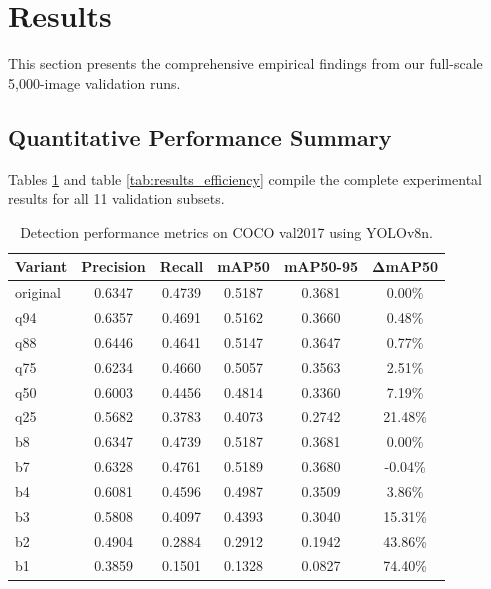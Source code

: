 \documentclass[12pt, a4paper]{article}
\begin{document}
\section{Results}
This section presents the comprehensive empirical findings from our full-scale 5,000-image validation runs.

\subsection{Quantitative Performance Summary}
Tables \ref{tab:results_perf} and table \ref{tab:results_efficiency} compile the complete experimental results for all 11 validation subsets. 

\begin{table}[t]
\centering
\caption{Detection performance metrics on COCO val2017 using YOLOv8n.}
\label{tab:results_perf}

\begin{tabular}{|l|c|c|c|c|c|}
\hline
\textbf{Variant} & \textbf{Precision} & \textbf{Recall} & \textbf{mAP50} & \textbf{mAP50-95} & $\boldsymbol{\Delta}$\textbf{mAP50} \\ \hline

original & 0.6347 & 0.4739 & 0.5187 & 0.3681 & 0.00\% \\ \hline
q94 & 0.6357 & 0.4691 & 0.5162 & 0.3660 & 0.48\% \\ \hline
q88 & 0.6446 & 0.4641 & 0.5147 & 0.3647 & 0.77\% \\ \hline
q75 & 0.6234 & 0.4660 & 0.5057 & 0.3563 & 2.51\% \\ \hline
q50 & 0.6003 & 0.4456 & 0.4814 & 0.3360 & 7.19\% \\ \hline
q25 & 0.5682 & 0.3783 & 0.4073 & 0.2742 & 21.48\% \\ \hline
b8 & 0.6347 & 0.4739 & 0.5187 & 0.3681 & 0.00\% \\ \hline
b7 & 0.6328 & 0.4761 & 0.5189 & 0.3680 & -0.04\% \\ \hline
b4 & 0.6081 & 0.4596 & 0.4987 & 0.3509 & 3.86\% \\ \hline
b3 & 0.5808 & 0.4097 & 0.4393 & 0.3040 & 15.31\% \\ \hline
b2 & 0.4904 & 0.2884 & 0.2912 & 0.1942 & 43.86\% \\ \hline
b1 & 0.3859 & 0.1501 & 0.1328 & 0.0827 & 74.40\% \\ \hline

\end{tabular}
\end{table}
\end{document}
